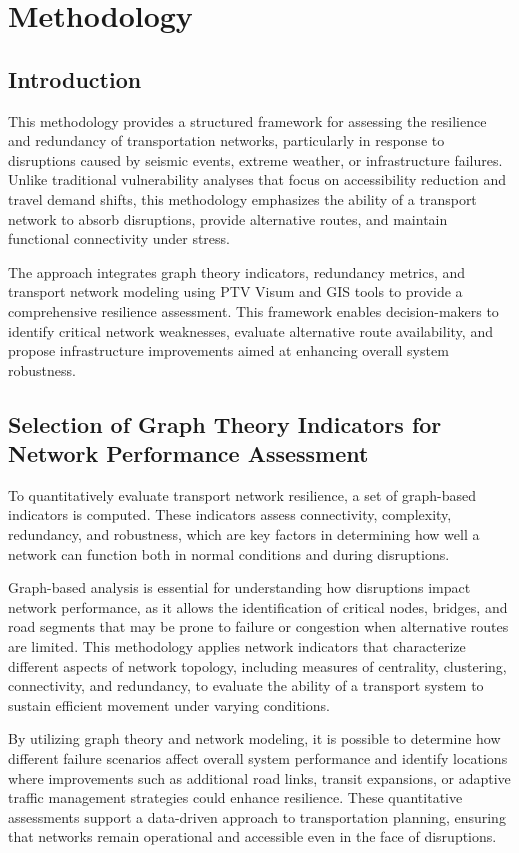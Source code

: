 \chapter{Methodology}

\section{Introduction}
This methodology provides a structured framework for assessing the resilience and redundancy of transportation networks, particularly in response to disruptions caused by seismic events, extreme weather, or infrastructure failures. Unlike traditional vulnerability analyses that focus on accessibility reduction and travel demand shifts, this methodology emphasizes the ability of a transport network to absorb disruptions, provide alternative routes, and maintain functional connectivity under stress.

The approach integrates graph theory indicators, redundancy metrics, and transport network modeling using PTV Visum and GIS tools to provide a comprehensive resilience assessment. This framework enables decision-makers to identify critical network weaknesses, evaluate alternative route availability, and propose infrastructure improvements aimed at enhancing overall system robustness.

\section{Selection of Graph Theory Indicators for Network Performance Assessment}
To quantitatively evaluate transport network resilience, a set of graph-based indicators is computed. These indicators assess connectivity, complexity, redundancy, and robustness, which are key factors in determining how well a network can function both in normal conditions and during disruptions.

Graph-based analysis is essential for understanding how disruptions impact network performance, as it allows the identification of critical nodes, bridges, and road segments that may be prone to failure or congestion when alternative routes are limited. This methodology applies network indicators that characterize different aspects of network topology, including measures of centrality, clustering, connectivity, and redundancy, to evaluate the ability of a transport system to sustain efficient movement under varying conditions.

By utilizing graph theory and network modeling, it is possible to determine how different failure scenarios affect overall system performance and identify locations where improvements such as additional road links, transit expansions, or adaptive traffic management strategies could enhance resilience. These quantitative assessments support a data-driven approach to transportation planning, ensuring that networks remain operational and accessible even in the face of disruptions.


